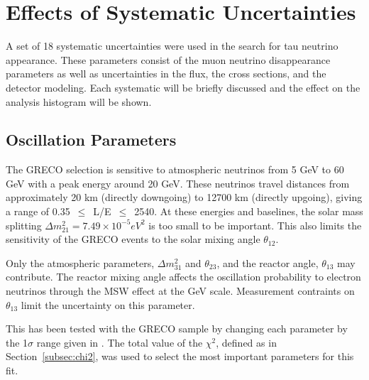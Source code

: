 











\label{sec:systematics}
\section{Effects of Systematic Uncertainties}
A set of 18 systematic uncertainties were used in the search for tau neutrino appearance.
These parameters consist of the muon neutrino disappearance parameters as well as uncertainties in the flux, the cross sections, and the detector modeling.
Each systematic will be briefly discussed and the effect on the analysis histogram will be shown.


\label{subsec:oscillation_params}
\subsection{Oscillation Parameters}
The GRECO selection is sensitive to atmospheric neutrinos from 5 GeV to 60 GeV with a peak energy around 20 GeV.
These neutrinos travel distances from approximately 20 km (directly downgoing) to 12700 km (directly upgoing), giving a range of 0.35~$\leq$~L/E~$\leq$~2540.
At these energies and baselines, the solar mass splitting $\Delta m^2_{21}=7.49\times 10^{-5} eV^2$ is too small to be important.
This also limits the sensitivity of the GRECO events to the solar mixing angle $\theta_{12}$.

Only the atmospheric parameters, $\Delta m^2_{31}$ and $\theta_{23}$, and the reactor angle, $\theta_{13}$ may contribute.
The reactor mixing angle affects the oscillation probability to electron neutrinos through the MSW effect at the GeV scale.
Measurement contraints on $\theta_{13}$ limit the uncertainty on this parameter.

This has been tested with the GRECO sample by changing each parameter by the 1${\sigma}$ range given in \cite{NuFit.org}.
The total value of the ${\chi^2}$, defined as in Section~\ref{subsec:chi2}, was used to select the most important parameters for this fit.

